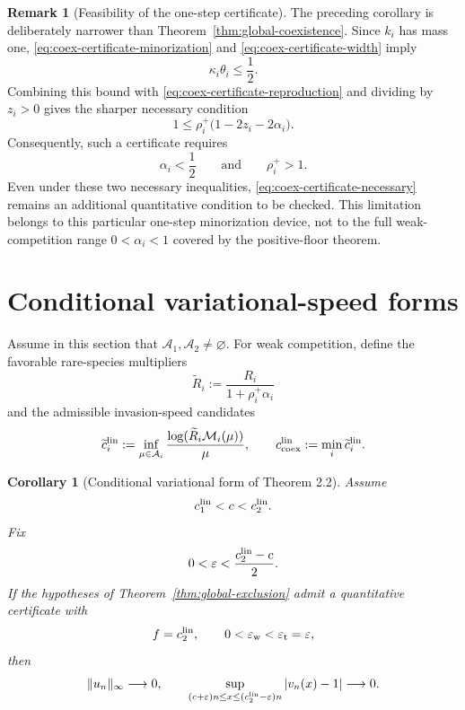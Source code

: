 \documentclass[11pt]{article}
\newtheorem{corollary}[theorem]{Corollary}
\theoremstyle{definition}
\newtheorem{remark}[theorem]{Remark}
\newcommand{\M}{\mathcal M}
\begin{document}
\begin{remark}[Feasibility of the one-step certificate]
\label{rem:certificate-feasibility}
The preceding corollary is deliberately narrower than
Theorem~\ref{thm:global-coexistence}.  Since \(k_i\) has mass one,
\eqref{eq:coex-certificate-minorization} and
\eqref{eq:coex-certificate-width} imply
\[
  \kappa_i\theta_i\leq\frac12.
\]
Combining this bound with
\eqref{eq:coex-certificate-reproduction} and dividing by \(z_i>0\) gives
the sharper necessary condition
\begin{equation}\label{eq:coex-certificate-necessary}
  1
  \leq
  \rho_i^+\bigl(1-2z_i-2\alpha_i\bigr).
\end{equation}
Consequently, such a certificate requires
\[
  \alpha_i<\frac12
  \qquad\text{and}\qquad
  \rho_i^+>1.
\]
Even under these two necessary inequalities,
\eqref{eq:coex-certificate-necessary} remains an additional quantitative
condition to be checked.  This limitation belongs to this particular
one-step minorization device, not to the full weak-competition range
\(0<\alpha_i<1\) covered by the positive-floor theorem.
\end{remark}

\section{Conditional variational-speed forms}
\label{sec:conditional-speeds}

Assume in this section that
\(\mathcal A_1,\mathcal A_2\neq\varnothing\).  For weak competition, define
the favorable rare-species multipliers
\[
  \widetilde R_i
  :=
  \frac{R_i}{1+\rho_i^+\alpha_i}
\]
and the admissible invasion-speed candidates
\begin{equation}\label{eq:reduced-speeds}
  \widetilde c_i^{\rm lin}
  :=
  \inf_{\mu\in\mathcal A_i}
  \frac{\log(\widetilde R_i\M_i(\mu))}{\mu},
  \qquad
  c_{\rm coex}^{\rm lin}
  :=
  \min_i\widetilde c_i^{\rm lin}.
\end{equation}

\begin{corollary}[Conditional variational form of Theorem 2.2]
\label{cor:conditional-exclusion-speed}
Assume
\[
  c_1^{\rm lin}<c<c_2^{\rm lin}.
\]
Fix
\[
  0<\varepsilon<
  \frac{c_2^{\rm lin}-c}{2}.
\]
If the hypotheses of Theorem~\ref{thm:global-exclusion} admit a quantitative
certificate with
\[
  f=c_2^{\rm lin},
  \qquad
  0<\varepsilon_{\rm w}<\varepsilon_{\rm t}=\varepsilon,
\]
then
\[
  \|u_n\|_\infty\longrightarrow0,
  \qquad
  \sup_{(c+\varepsilon)n\leq x\leq
             (c_2^{\rm lin}-\varepsilon)n}
  |v_n(x)-1|\longrightarrow0.
\]
\end{corollary}
\end{document}
